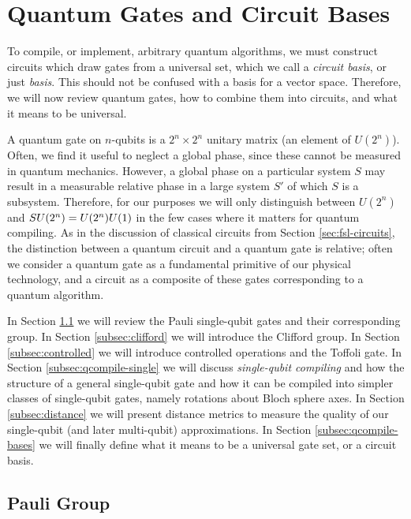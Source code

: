 \section{Quantum Gates and Circuit Bases}
\label{sec:qcompile-basis}

To compile, or implement, arbitrary quantum algorithms, we must construct circuits
which draw gates from a universal set, which we call a \emph{circuit basis},
or just \emph{basis}.
This should not be confused with a basis for a vector space.
Therefore, we will now review quantum gates, how to combine them into
circuits, and what it means to be universal.

A quantum gate on $n$-qubits is a $2^n \times 2^n$ unitary matrix
(an element of $U(2^n)$). Often, we find it useful to neglect a
global phase, since these cannot be measured in quantum mechanics.
However, a global
phase on a particular system $S$ may result in a measurable relative phase
in a large system $S'$ of which $S$ is a subsystem. Therefore, for our
purposes we will only distinguish between $U(2^n)$ and
$SU(2^n) = U(2^n) \\ U(1)$ in the few cases where it matters for
quantum compiling. As in the discussion of classical circuits from
Section \ref{sec:fsl-circuits}, the distinction between a quantum circuit
and a quantum gate is relative; often we consider a quantum gate as a
fundamental primitive of our physical technology, and a circuit as a
composite of these gates corresponding to a quantum algorithm.

In Section \ref{subsec:pauli} we
will review the Pauli single-qubit gates and their corresponding group.
In Section \ref{subsec:clifford} we will introduce the Clifford group.
In Section \ref{subsec:controlled} we will introduce controlled operations
and the Toffoli gate.
In Section \ref{subsec:qcompile-single} we will discuss \emph{single-qubit compiling}
and how the structure of a
general single-qubit gate and how it can be compiled into simpler classes
of single-qubit gates, namely rotations about Bloch sphere axes.
In Section \ref{subsec:distance} we will present distance metrics to
measure the quality of our single-qubit (and later multi-qubit) approximations.
In Section \ref{subsec:qcompile-bases} we will finally
define what it means to be a universal gate set, or a circuit basis.

\subsection{Pauli Group}
\label{subsec:pauli}

